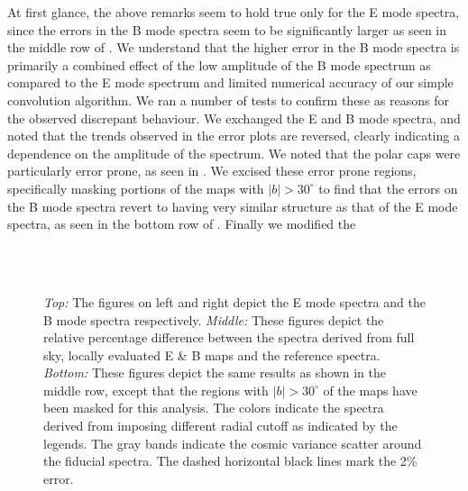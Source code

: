 At first glance, the above remarks seem to hold true only for the E mode spectra, since the errors in the B mode spectra seem to be significantly larger as seen in the middle row of . We understand that the higher error in the B mode spectra is primarily a combined effect of the low amplitude of the B mode spectrum as compared to the E mode spectrum and limited numerical accuracy of our simple convolution algorithm. We ran a number of tests to confirm these as reasons for the observed discrepant behaviour. We exchanged the E and B mode spectra,  and noted that the trends observed in the error plots are reversed, clearly indicating a dependence on the amplitude of the spectrum. We noted that the polar caps were particularly error prone, as seen in . We excised these error prone regions, specifically masking portions of the maps with $|b|>30^{\circ}$ to find that the errors on the B mode spectra revert to having very similar structure as that of the E mode spectra, as seen in the bottom row of . Finally we modified the 
%
\begin{figure}[!h] 
\centering
\\[-6ex]
\\[-6ex]
\caption{\textit{Top:} The figures on left and right depict the E mode spectra and the B mode spectra respectively. \textit{Middle:} These figures depict the relative percentage difference between the spectra derived from full sky, locally evaluated E \& B  maps and the reference spectra. \textit{Bottom:} These figures depict the same results as shown in the middle row, except that the regions with $|b|>30^\circ$ of the maps have been masked for this analysis. 
The colors indicate the spectra derived from imposing different radial cutoff as indicated by the legends. The gray bands indicate the cosmic variance scatter around the fiducial spectra. The dashed horizontal black lines mark the 2\% error.}
\label{fig:eb-spectra_rad_cutoff}
\end{figure}
%
